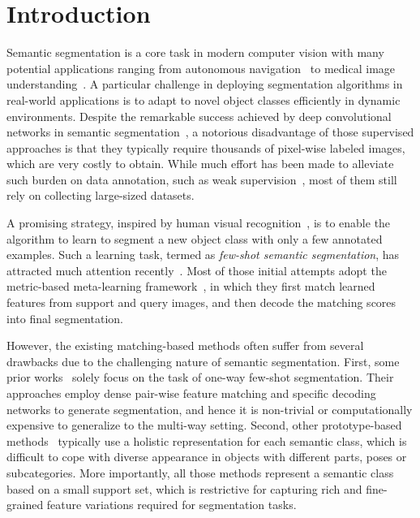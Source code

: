 \documentclass[runningheads]{llncs}
\begin{document}
\section{Introduction}
Semantic segmentation is a core task in modern computer vision with many potential applications ranging from autonomous navigation~\cite{Brabandere2017Semantic} to medical image understanding~\cite{chung2017learning}. A particular challenge in deploying segmentation algorithms in real-world applications is to adapt to novel object classes efficiently in dynamic environments. Despite the remarkable success achieved by deep convolutional networks in semantic segmentation~\cite{long2015fully,badrinarayanan2017segnet,chen2017rethinking,zhao2017pyramid}, a notorious disadvantage of those supervised approaches is that they typically require thousands of pixel-wise labeled images, which are very costly to obtain. While much effort has been made to alleviate such burden on data annotation, such as weak supervision~\cite{kipf2017semi}, most of them still rely on collecting large-sized datasets. 

A promising strategy, inspired by human visual recognition~\cite{russakovsky2015imagenet}, is to enable the algorithm to learn to segment a new object class with only a few annotated examples. Such a learning task, termed as \textit{few-shot semantic segmentation}, has attracted much attention recently~\cite{rakelly2018conditional,boots2017one,wang2019panet,rakelly2018few}.
Most of those initial attempts adopt the metric-based meta-learning framework~\cite{vinyals2016matching}, in which they first match learned features from support and query images, and then decode the matching scores into final segmentation. 

However, the existing matching-based methods often suffer from several drawbacks due to the challenging nature of semantic segmentation. 
First, some prior works~\cite{zhang2018sg,zhang2019canet,zhang2019pyramid} solely focus on the task of one-way few-shot segmentation. Their approaches employ dense pair-wise feature matching and specific decoding networks to generate segmentation, and hence it is non-trivial or computationally expensive to generalize to the multi-way setting. Second, other prototype-based methods~\cite{dong2018few,siam2019adaptive,wang2019panet} typically use a holistic representation for each semantic class, which is difficult to cope with diverse appearance in objects with different parts, poses or subcategories.     
More importantly, all those methods represent a semantic class based on a small support set, which is restrictive for capturing rich and fine-grained feature variations required for segmentation tasks. 
  
\end{document}
